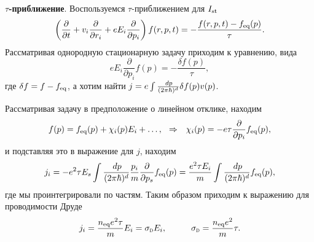 \textbf{$\tau$-приближение}. Воспользуемся $\tau$-приближением для $I_{\textnormal{st}}$
\begin{equation*}
	\left(
		\frac{\partial }{\partial t} + v_i \frac{\partial }{\partial r_i} + e E_i \frac{\partial }{\partial p_i} 
	\right) f(r, p, t) = - \frac{f(r, p, t) - f_{\textnormal{eq}} (p)}{\tau}.
\end{equation*}
Рассматривая однородную стационарную задачу приходим к уравнению, вида
\begin{equation*}
	e E_i \frac{\partial }{\partial p_i} f(p) = - \frac{\delta f(p)}{\tau},
\end{equation*}
где $\delta f = f - f_{\textnormal{eq}}$, а хотим найти $j = e \int \frac{\, d p}{(2 \pi \hbar)^d} \delta f(p) v(p)$.

Рассматривая задачу в предположение о линейном отклике, находим
\begin{equation*}
	f(p) = f_{\textnormal{eq}} (p) + \chi_i (p) E_i + \ldots,
	\hspace{0.25cm} \Rightarrow \hspace{0.25cm}
	\chi_i (p) = - e \tau \frac{\partial }{\partial p_i} f_{\textnormal{eq}} (p),
\end{equation*}
и подставляя это в выражение для $j$, находим
\begin{equation*}
	j_i = - e^2 \tau E_s \int \frac{\, d p}{(2 \pi \hbar)^d} \frac{p_i}{m} \frac{\partial }{\partial p_s} f_{\textnormal{eq}} (p) = \frac{e^2 \tau E_i}{m} \int \frac{\, d p}{(2 \pi \hbar)^d} f_{\textnormal{eq}} (p),
\end{equation*}
где мы проинтегрировали по частям. Таким образом приходим к выражению для проводимости Друде
\begin{equation*}
	 j_i = \frac{\sub{n}{eq} e^2 \tau}{m} E_i = \sigD E_i,
	 \hspace{10 mm} 
	 \sigD = \frac{\sub{n}{eq} e^2}{m} \tau.
\end{equation*}

